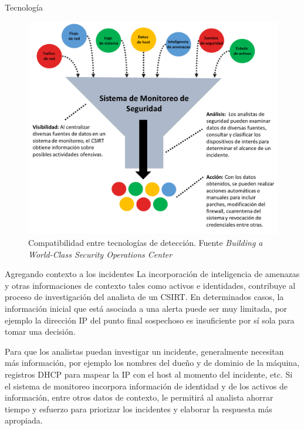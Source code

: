 \begin{section}{Tecnología}
        \begin{figure}[H]
            \centering
            \includegraphics[width=1\textwidth]{./marco_teorico_imagenes/figura_3_compatibilidad_entre_tecnologias.png}
            \caption{Compatibilidad entre tecnologías de detección. Fuente \textit{Building a World-Class Security Operations Center} \cite{sans_2}}
            \label{fig:comp_tech}
        \end{figure}
        \FloatBarrier
        \begin{subsection}{Agregando contexto a los incidentes}
        La incorporación de inteligencia de amenazas y otras informaciones de contexto tales como activos e identidades, contribuye al proceso de investigación del analista de un CSIRT. En determinados casos, la información inicial que está asociada a una alerta puede ser muy limitada, por ejemplo la dirección IP del punto final sospechoso es insuficiente por sí sola para tomar una decisión. \par
        Para que los analistas puedan investigar un incidente, generalmente necesitan más información, por ejemplo los nombres del dueño y de dominio de la máquina, registros DHCP para mapear la IP con el host al momento del incidente, etc. Si el sistema de monitoreo incorpora información de identidad y de los activos de información, entre otros datos de contexto, le permitirá al analista ahorrar tiempo y esfuerzo para priorizar los incidentes y elaborar la respuesta más apropiada.\par


\end{subsection}
\end{section}
